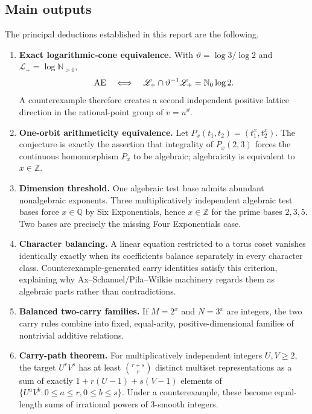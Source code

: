 \documentclass[11pt,oneside]{article}
\theoremstyle{definition}
\newcommand{\Q}{\mathbb{Q}}
\newcommand{\Z}{\mathbb{Z}}
\newcommand{\N}{\mathbb{N}}
\newcommand{\AEconj}{\textup{AE}}
\newcommand{\cL}{\mathscr{L}}
\begin{document}
\subsection{Main outputs}

The principal deductions established in this report are the following.

\begin{resultbox}
\begin{enumerate}
\item \textbf{Exact logarithmic-cone equivalence.}  With $\vartheta=\log 3/\log 2$ and $\cL_+=\log\N_{>0}$,
\[
   \AEconj\quad\Longleftrightarrow\quad
   \cL_+\cap\vartheta^{-1}\cL_+=\N_0\log 2.
\]
A counterexample therefore creates a second independent positive lattice direction in the rational-point group of $v=u^{\vartheta}$.

\item \textbf{One-orbit arithmeticity equivalence.}  Let $P_x(t_1,t_2)=(t_1^x,t_2^x)$.  The conjecture is exactly the assertion that integrality of $P_x(2,3)$ forces the continuous homomorphism $P_x$ to be algebraic; algebraicity is equivalent to $x\in\Z$.

\item \textbf{Dimension threshold.}  One algebraic test base admits abundant nonalgebraic exponents.  Three multiplicatively independent algebraic test bases force $x\in\Q$ by Six Exponentials, hence $x\in\Z$ for the prime bases $2,3,5$.  Two bases are precisely the missing Four Exponentials case.

\item \textbf{Character balancing.}  A linear equation restricted to a torus coset vanishes identically exactly when its coefficients balance separately in every character class.  Counterexample-generated carry identities satisfy this criterion, explaining why Ax--Schanuel/Pila--Wilkie machinery regards them as algebraic parts rather than contradictions.

\item \textbf{Balanced two-carry families.}  If $M=2^x$ and $N=3^x$ are integers, the two carry rules combine into fixed, equal-arity, positive-dimensional families of nontrivial additive relations.

\item \textbf{Carry-path theorem.}  For multiplicatively independent integers $U,V\ge2$, the target $U^rV^s$ has at least $\binom{r+s}{r}$ distinct multiset representations as a sum of exactly $1+r(U-1)+s(V-1)$ elements of $\{U^aV^b:0\le a\le r,0\le b\le s\}$.  Under a counterexample, these become equal-length sums of irrational powers of $3$-smooth integers.


\end{enumerate}
\end{resultbox}
\end{document}

